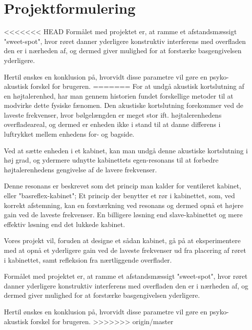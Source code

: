 \chapter{Projektformulering}

<<<<<<< HEAD
Formålet med projektet er, at ramme et afstandsmæssigt "sweet-spot", hvor røret danner yderligere konstruktiv interferens med overfladen den er i nærheden af, og dermed giver mulighed for at forstærke basgengivelsen yderligere. 

Hertil ønskes en konklusion på, hvorvidt disse parametre vil gøre en psyko-akustisk forskel for brugeren. 
=======
For at undgå akustisk kortslutning af en højtalerenhed, har man gennem historien fundet forskellige metoder til at modvirke dette fysiske fænomen. 
Den akustiske kortslutning forekommer ved de laveste frekvenser, hvor bølgelængden er meget stor ift. højtalerenhedens overfladeareal, og dermed er enheden ikke i stand til at danne differens i luftrykket mellem enhedens for- og bagside.

Ved at sætte enheden i et kabinet, kan man undgå denne akustiske kortslutning i høj grad, og ydermere udnytte kabinettets egen-resonans til at forbedre højtalerenhedens gengivelse af de lavere frekvenser. 

Denne resonans er beskrevet som det princip man kalder for ventileret kabinet, eller "basreflex-kabinet"; Et princip der benytter et rør i kabinettet, som, ved korrekt afstemning, kan en forstærkning ved resonans og dermed opnå et højere gain ved de laveste frekvenser. En billigere løsning end slave-kabinettet og mere effektiv løsning end det lukkede kabinet. 

Vores projekt vil, foruden at designe et sådan kabinet, gå på at eksperimentere med at opnå et yderligere gain ved de laveste frekvenser ud fra placering af røret i kabinettet, samt refleksion fra nærtliggende overflader. 

Formålet med projektet er, at ramme et afstandsmæssigt "sweet-spot", hvor røret danner yderligere konstruktiv interferens med overfladen den er i nærheden af, og dermed giver mulighed for at forstærke basgengivelsen yderligere. 

Hertil ønskes en konklusion på, hvorvidt disse parametre vil gøre en psyko-akustisk forskel for brugeren. 
>>>>>>> origin/master

